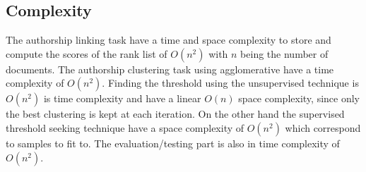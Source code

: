 \subsection{Complexity}

The authorship linking task have a time and space complexity to store and compute the scores of the rank list of $O(n^2)$ with $n$ being the number of documents.
The authorship clustering task using agglomerative have a time complexity of $O(n^2)$.
Finding the threshold using the unsupervised technique is $O(n^2)$ is time complexity and have a linear $O(n)$ space complexity, since only the best clustering is kept at each iteration.
On the other hand the supervised threshold seeking technique have a space  complexity of $O(n^2)$ which correspond to samples to fit to.
The evaluation/testing part is also in time complexity of $O(n^2)$.
